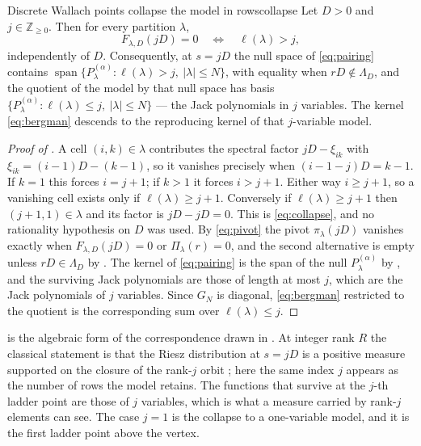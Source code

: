 \documentclass[11pt,letterpaper]{article}
\newcommand{\Zint}{\mathbb{Z}}
\begin{document}
\begin{proposition}{Discrete Wallach points collapse the model in rows}{collapse}
Let $D>0$ and $j\in\Zint_{\ge0}$. Then for every partition $\lambda$,
\begin{equation}
  F_{\lambda,D}(jD)=0
  \quad\Longleftrightarrow\quad
  \ell(\lambda)>j ,
  \label{eq:collapse}
\end{equation}
independently of $D$. Consequently, at $s=jD$ the null space of
\eqref{eq:pairing} contains
$\operatorname{span}\{P^{(\alpha)}_\lambda:\ell(\lambda)>j,\ |\lambda|\le N\}$,
with equality when $rD\notin\Lambda_D$, and the quotient of the model by that
null space has basis $\{P^{(\alpha)}_\lambda:\ell(\lambda)\le j,\ |\lambda|\le N\}$
--- the Jack polynomials in $j$ variables. The kernel \eqref{eq:bergman} descends
to the reproducing kernel of that $j$-variable model.
\end{proposition}

\begin{proof}[Proof of ]
A cell $(i,k)\in\lambda$ contributes the spectral factor $jD-\xi_{ik}$ with
$\xi_{ik}=(i-1)D-(k-1)$, so it vanishes precisely when $(i-1-j)D=k-1$. If $k=1$
this forces $i=j+1$; if $k>1$ it forces $i>j+1$. Either way $i\ge j+1$, so a
vanishing cell exists only if $\ell(\lambda)\ge j+1$. Conversely if
$\ell(\lambda)\ge j+1$ then $(j+1,1)\in\lambda$ and its factor is $jD-jD=0$. This
is \eqref{eq:collapse}, and no rationality hypothesis on $D$ was used. By
\eqref{eq:pivot} the pivot $\pi_\lambda(jD)$ vanishes exactly when
$F_{\lambda,D}(jD)=0$ or $\Pi_\lambda(r)=0$, and the second alternative is empty
unless $rD\in\Lambda_D$ by . The kernel of \eqref{eq:pairing}
is the span of the null $P^{(\alpha)}_\lambda$ by , and the
surviving Jack polynomials are those of length at most $j$, which are the Jack
polynomials of $j$ variables. Since $G_N$ is diagonal, \eqref{eq:bergman}
restricted to the quotient is the corresponding sum over $\ell(\lambda)\le j$.
\end{proof}

 is the algebraic form of the correspondence drawn in
. At integer rank $R$ the classical statement is that the Riesz
distribution at $s=jD$ is a positive measure supported on the closure of the
rank-$j$ orbit \cite[Prop.~VII.2.3]{FK}; here the same index $j$ appears as the
number of rows the model retains. The functions that survive at the $j$-th
ladder point are those of $j$ variables, which is what a measure carried by
rank-$j$ elements can see. The case $j=1$ is the collapse to a one-variable
model, and it is the first ladder point above the vertex.
\end{document}
